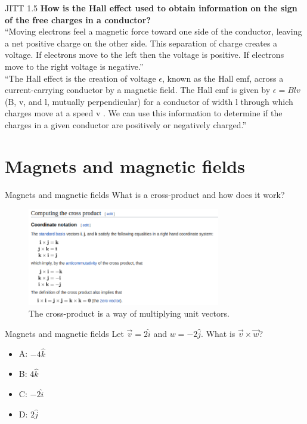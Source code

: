 \documentclass{beamer}
\begin{document}
\begin{frame}{JITT 1.5}
\small
\textbf{How is the Hall effect used to obtain information on the sign of the free charges in a conductor?} \\ \vspace{0.5cm}
``Moving electrons feel a magnetic force toward one side of the conductor, leaving a net positive charge on the other side. This separation of charge creates a voltage. If electrons move to the left then the voltage is positive. If electrons move to the right voltage is negative.'' \\ \vspace{0.5cm}
``The Hall effect is the creation of voltage $\epsilon$, known as the Hall emf, across a current-carrying conductor by a magnetic field. The Hall emf is given by $\epsilon = Blv$ (B, v, and l, mutually perpendicular) for a conductor of width l through which charges move at a speed v . We can use this information to determine if the charges in a given conductor are positively or negatively charged.''
\end{frame}

\section{Magnets and magnetic fields}

\begin{frame}{Magnets and magnetic fields}
What is a cross-product and how does it work? \\ \vspace{0.25cm}
\begin{figure}
\centering
\includegraphics[width=0.75\textwidth]{figures/crossP.png}
\caption{\label{fig:crossP} The cross-product is a way of multiplying unit vectors.}
\end{figure}
\end{frame}

\begin{frame}{Magnets and magnetic fields}
Let $\vec{v} = 2\hat{i}$ and $w = -2 \hat{j}$.  What is $\vec{v} \times \vec{w}$?
\begin{itemize}
\item A: $-4 \hat{k}$
\item B: $4 \hat{k}$
\item C: $-2 \hat{i}$
\item D: $2 \hat{j}$
\end{itemize}
\end{frame}
\end{document}
